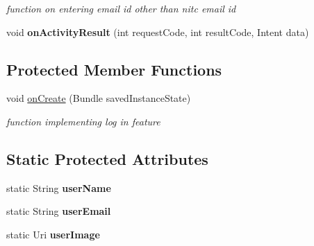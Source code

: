 \begin{DoxyCompactItemize}
\begin{DoxyCompactList}\small\item\em function on entering email id other than nitc email id \end{DoxyCompactList}\item 
void {\bfseries on\+Activity\+Result} (int request\+Code, int result\+Code, Intent data)\hypertarget{classcom_1_1example_1_1sel_1_1lostfound_1_1MainActivity_ad934ef9a9347dc67bcaf5365213f58da}{}\label{classcom_1_1example_1_1sel_1_1lostfound_1_1MainActivity_ad934ef9a9347dc67bcaf5365213f58da}

\end{DoxyCompactItemize}
\subsection*{Protected Member Functions}
\begin{DoxyCompactItemize}
\item 
void \hyperlink{classcom_1_1example_1_1sel_1_1lostfound_1_1MainActivity_ac0ce1d56e609a8b69d6227c6d4d59f48}{on\+Create} (Bundle saved\+Instance\+State)\hypertarget{classcom_1_1example_1_1sel_1_1lostfound_1_1MainActivity_ac0ce1d56e609a8b69d6227c6d4d59f48}{}\label{classcom_1_1example_1_1sel_1_1lostfound_1_1MainActivity_ac0ce1d56e609a8b69d6227c6d4d59f48}

\begin{DoxyCompactList}\small\item\em function implementing log in feature \end{DoxyCompactList}\end{DoxyCompactItemize}
\subsection*{Static Protected Attributes}
\begin{DoxyCompactItemize}
\item 
static String {\bfseries user\+Name}\hypertarget{classcom_1_1example_1_1sel_1_1lostfound_1_1MainActivity_a1a8d41b931cf85891f5fd3497d34a32a}{}\label{classcom_1_1example_1_1sel_1_1lostfound_1_1MainActivity_a1a8d41b931cf85891f5fd3497d34a32a}

\item 
static String {\bfseries user\+Email}\hypertarget{classcom_1_1example_1_1sel_1_1lostfound_1_1MainActivity_a02198420522a5b05dbc3202b74dd9a59}{}\label{classcom_1_1example_1_1sel_1_1lostfound_1_1MainActivity_a02198420522a5b05dbc3202b74dd9a59}

\item 
static Uri {\bfseries user\+Image}\hypertarget{classcom_1_1example_1_1sel_1_1lostfound_1_1MainActivity_a92248fd7e13b4972f457ad9791ba253c}{}\label{classcom_1_1example_1_1sel_1_1lostfound_1_1MainActivity_a92248fd7e13b4972f457ad9791ba253c}

\end{DoxyCompactItemize}


